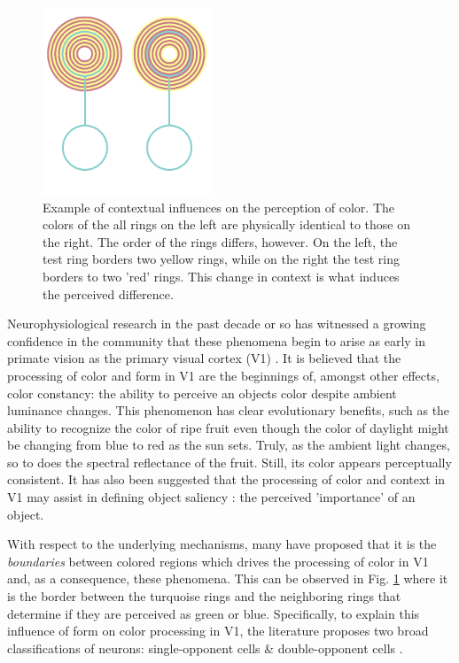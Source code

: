 \documentclass[journal,onecolumn]{IEEEtran}
\begin{document}
\begin{figure}[H]
    \center
    \includegraphics[width=0.45\textwidth]{test-circle-a-reference}
    \caption{Example of contextual influences on the perception of color. The colors of the all rings on the left are physically identical to those on the right. The order of the rings differs, however. On the left, the test ring borders two yellow rings, while on the right the test ring borders to two 'red' rings. This change in context is what induces the perceived difference.}
    \label{fig:example}
\end{figure}

\newpage

Neurophysiological research in the past decade or so has witnessed a growing confidence in the community that these phenomena begin to arise as early in primate vision as the primary visual cortex (V1) \cite{conway:2010, johnson:2008, schluppeck:2002, sincich:2005, solomon:2007, shapley:2011}. It is believed that the processing of color and form in V1 are the beginnings of, amongst other effects, color constancy: the ability to perceive an objects color despite ambient luminance changes. This phenomenon has clear evolutionary benefits, such as the ability to recognize the color of ripe fruit even though the color of daylight might be changing from blue to red as the sun sets. Truly, as the ambient light changes, so to does the spectral reflectance of the fruit. Still, its color appears perceptually consistent. It has also been suggested that the processing of color and context in V1 may assist in defining object saliency \cite{li:2002}: the perceived 'importance' of an object.

With respect to the underlying mechanisms, many have proposed that it is the \textit{boundaries} between colored regions which drives the processing of color in V1 \cite{conway:2010, johnson:2008, schluppeck:2002, sincich:2005, solomon:2007, shapley:2011} and, as a consequence, these phenomena. This can be observed in Fig. \ref{fig:example} where it is the border between the turquoise rings and the neighboring rings that determine if they are perceived as green or blue. Specifically, to explain this influence of form on color processing in V1, the literature proposes two broad classifications of neurons: single-opponent cells \& double-opponent cells \cite{johnson:2008}.
\end{document}
